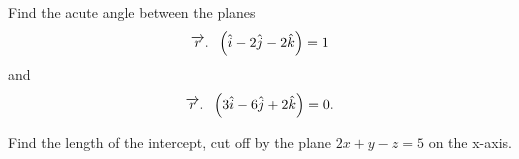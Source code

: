  \item Find the acute angle between the planes 
        \begin{align*}
         \overrightarrow{r}.\hspace{6pt}\left(\hat{i}-2\hat{j}-2\hat{k}\right)=1
         \end{align*}
      and 
        \begin{align*}
          \overrightarrow{r}.\hspace{6pt}\left(3\hat{i}-6\hat{j}+2\hat{k}\right)=0.
         \end{align*}

    \item Find the length of the intercept, cut off by the plane $2x+y-z=5$ on the x-axis.

